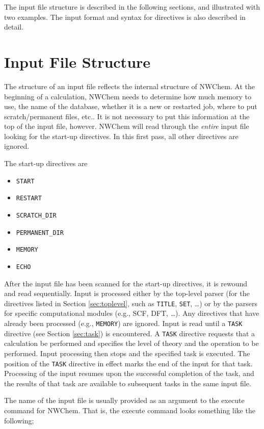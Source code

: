 The input file structure is described in the following sections, and
illustrated with two examples.  The input format and syntax for directives
is also described in detail.

\section{Input File Structure}
\label{sec:inputstructure}

The structure of an input file reflects the internal structure of
NWChem.  At the beginning of a calculation, NWChem needs to determine
how much memory to use, the name of the database, whether it is a new or
restarted job, where to put scratch/permanent files,
etc..  It is not necessary to put this information at the top of the
input file, however.  NWChem will read through the {\em entire} input
file looking for the start-up directives.  In this first pass, all other
directives are ignored.

The start-up directives are
\begin{itemize}
\item \verb+START+
\item \verb+RESTART+
\item \verb+SCRATCH_DIR+
\item \verb+PERMANENT_DIR+
\item \verb=MEMORY=
\item \verb=ECHO=
\end{itemize}

After the input file has been scanned for the start-up directives, it
is rewound and read sequentially.  Input is processed either by the
top-level parser (for the directives listed in Section
\ref{sec:toplevel}, such as \verb+TITLE+, \verb+SET+, \ldots) or by
the parsers for specific computational modules (e.g., SCF, DFT,
\ldots).  Any directives that have already been processed (e.g.,
\verb+MEMORY+) are ignored.  Input is read until a \verb+TASK+
directive (see Section \ref{sec:task}) is encountered.  A \verb+TASK+
directive requests that a calculation be performed and specifies the level
of theory and the operation to be performed.  Input processing then
stops and the specified task is executed.  The position of the
\verb+TASK+ directive in effect marks the end of the input for that
task.  Processing of the input resumes upon the successful completion
of the task, and the results of that task are available to subsequent
tasks in the same input file.

The name of the input file is usually provided as an argument to the
execute command for NWChem.  That is, the execute command looks
something like the following;

